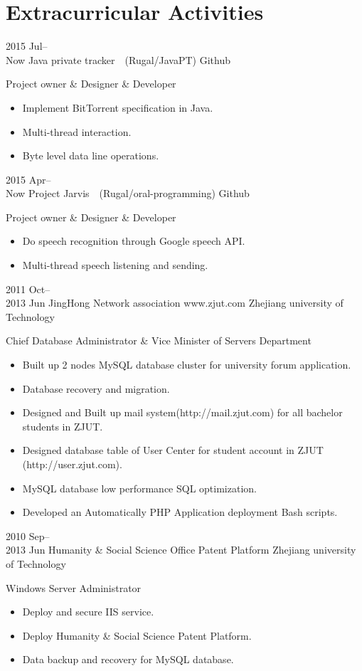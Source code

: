 \documentclass[]{friggeri-cv} %
\begin{document}
\section{Extracurricular Activities}
\begin{entrylist}
\entry
{2015 Jul--\\ Now}
{Java private tracker\ \ (Rugal/JavaPT)}
{Github}
{Project owner \& Designer \& Developer\\
	\begin{itemize}
		\item Implement BitTorrent specification in Java.
		\item Multi-thread interaction.
		\item Byte level data line operations.
	\end{itemize}
}
\entry
{2015 Apr--\\ Now}
{Project Jarvis\ \ (Rugal/oral-programming)}
{Github}
{Project owner \& Designer \& Developer\\
	\begin{itemize}
		\item Do speech recognition through Google speech API.
		\item Multi-thread speech listening and sending.
	\end{itemize}
}
\entry
{2011 Oct--\\ 2013 Jun}
{JingHong Network association   www.zjut.com}
{Zhejiang university of Technology}
{Chief Database Administrator \& Vice Minister of Servers Department\\
\begin{itemize}
	\item Built up 2 nodes MySQL database cluster for university forum application.
	\item Database recovery and migration.
	\item Designed and Built up mail system(http://mail.zjut.com) for all bachelor students in ZJUT.
	\item Designed database table of User Center for student account in ZJUT (http://user.zjut.com).
	\item MySQL database low performance SQL optimization.
	\item Developed an Automatically PHP Application deployment Bash scripts. 
\end{itemize}
}
\entry
{2010 Sep--\\ 2013 Jun}
{Humanity \& Social Science Office Patent Platform}
{Zhejiang university of Technology}
{Windows Server Administrator\\
	\begin{itemize}
		\item Deploy and secure IIS service.
		\item Deploy Humanity \& Social Science Patent Platform.
		\item Data backup and recovery for MySQL database.
	\end{itemize}
}
\end{entrylist}
\end{document}
